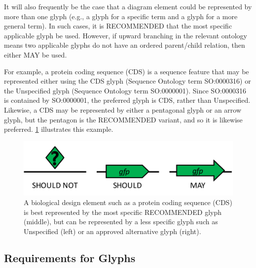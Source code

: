 It will also frequently be the case that a diagram element could be represented by more than one glyph (e.g., a glyph for a specific term and a glyph for a more general term).
In such cases, it is RECOMMENDED that the most specific applicable glyph be used.
However, if upward branching in the relevant ontology means two applicable glyphs do not have an ordered parent/child relation, then either MAY be used.

For example, a protein coding sequence (CDS) is a sequence feature that may be represented either using the CDS glyph (Sequence Ontology term SO:0000316) or the Unspecified glyph (Sequence Ontology term SO:0000001).  
Since SO:0000316 is contained by SO:0000001, the preferred glyph is CDS, rather than Unspecified.
Likewise, a CDS may be represented by either a pentagonal glyph or an arrow glyph, but the pentagon is the RECOMMENDED variant, and so it is likewise preferred.  
\ref{f:glyphalternatives} illustrates this example.

\begin{figure}[h!]
\centering
\includegraphics[scale=0.6]{figures/glyphalternatives.pdf}
\caption{A biological design element such as a protein coding sequence (CDS) is best represented by the most specific RECOMMENDED glyph (middle), but can be represented by a less specific glyph such as Unspecified (left) or an approved alternative glyph (right).}
\label{f:glyphalternatives}
\end{figure}

\subsection{Requirements for Glyphs}

